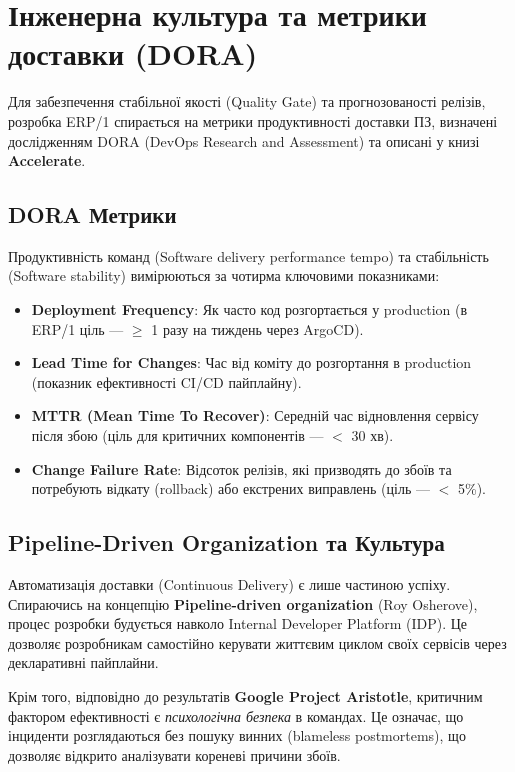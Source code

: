 \documentclass[12pt,a4paper]{article}
\begin{document}
\newpage
\section{Інженерна культура та метрики доставки (DORA)}

Для забезпечення стабільної якості (Quality Gate) та прогнозованості релізів, розробка ERP/1 спирається на метрики продуктивності доставки ПЗ, визначені дослідженням DORA (DevOps Research and Assessment) та описані у книзі \textbf{\guillemotleft Accelerate\guillemotright}.

\subsection{DORA Метрики}

Продуктивність команд (Software delivery performance tempo) та стабільність (Software stability) вимірюються за чотирма ключовими показниками:
\begin{itemize}[leftmargin=1.5cm]
    \item \textbf{Deployment Frequency}: Як часто код розгортається у production (в ERP/1 ціль --- $\geq$ 1 разу на тиждень через ArgoCD).
    \item \textbf{Lead Time for Changes}: Час від коміту до розгортання в production (показник ефективності CI/CD пайплайну).
    \item \textbf{MTTR (Mean Time To Recover)}: Середній час відновлення сервісу після збою (ціль для критичних компонентів --- $<$ 30 хв).
    \item \textbf{Change Failure Rate}: Відсоток релізів, які призводять до збоїв та потребують відкату (rollback) або екстрених виправлень (ціль --- $<$ 5\%).
\end{itemize}

\subsection{Pipeline-Driven Organization та Культура}

Автоматизація доставки (Continuous Delivery) є лише частиною успіху. Спираючись на концепцію \textbf{Pipeline-driven organization} (Roy Osherove), процес розробки будується навколо Internal Developer Platform (IDP). Це дозволяє розробникам самостійно керувати життєвим циклом своїх сервісів через декларативні пайплайни.

Крім того, відповідно до результатів \textbf{Google Project Aristotle}, критичним фактором ефективності є \textit{психологічна безпека} в командах. Це означає, що інциденти розглядаються без пошуку винних (blameless postmortems), що дозволяє відкрито аналізувати кореневі причини збоїв. 
\end{document}
